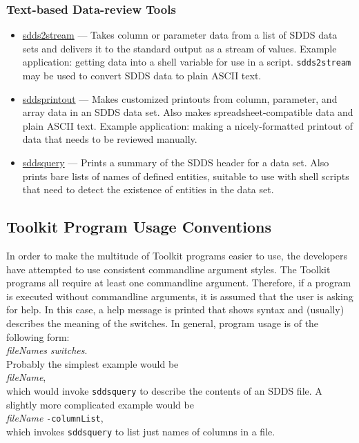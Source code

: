 \documentclass[11pt]{article}
\newcommand{\progref}[1]{\hyperref{#1}{{\tt #1} (}{)}{#1}}
\begin{document}
\subsubsection{Text-based Data-review Tools}

\begin{itemize}
\item \progref{sdds2stream} --- Takes column or parameter data from a list of SDDS data sets and delivers it to
the standard output as a stream of values.  Example application: getting data into a shell variable for use in a
script.  \verb|sdds2stream| may be used to convert SDDS data to plain ASCII text.

\item \progref{sddsprintout} --- Makes customized printouts from
column, parameter, and array data in an SDDS data set.  Also makes
spreadsheet-compatible data and plain ASCII text.  Example
application: making a nicely-formatted printout of data that needs to
be reviewed manually.

\item \progref{sddsquery} --- Prints a summary of the SDDS header for a data set.  Also prints bare lists of names
of defined entities, suitable to use with shell scripts that need to detect the existence of entities in the data
set.

\end{itemize}


\subsection{Toolkit Program Usage Conventions}

In order to make the multitude of Toolkit programs easier to use, the developers have attempted to use consistent
commandline argument styles.  The Toolkit programs all require at least one commandline argument.  Therefore, if a
program is executed without commandline arguments, it is assumed that the user is asking for help.  In this case, a
help message is printed that shows syntax and (usually) describes the meaning of the switches.  In general, program
usage is of the following form:\\
\hspace*{5mm}{\tt programName} {\em fileNames} {\em switches}.\\
Probably the simplest example would be \\ 
\hspace*{5mm}{\tt sddsquery } {\em fileName},\\
which would invoke {\tt sddsquery} to describe the contents of an SDDS file.
A slightly more complicated example would be\\
\hspace*{5mm}{\tt sddsquery } {\em fileName} {\tt -columnList},\\
which invokes {\tt sddsquery} to list just names of columns in a file.
\end{document}
